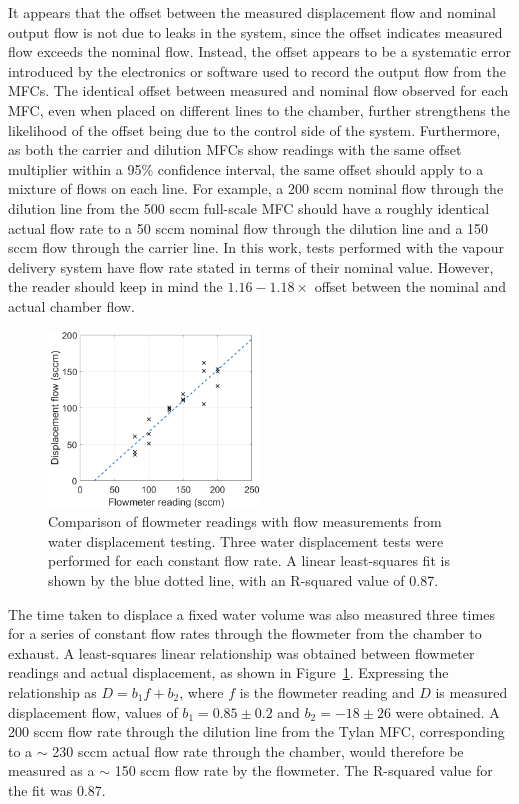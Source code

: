 \documentclass[
  a4paper,
]{scrbook}
\begin{document}
It appears that the offset between the measured displacement flow and
nominal output flow is not due to leaks in the system, since the offset
indicates measured flow exceeds the nominal flow. Instead, the offset
appears to be a systematic error introduced by the electronics or
software used to record the output flow from the MFCs. The identical
offset between measured and nominal flow observed for each MFC, even
when placed on different lines to the chamber, further strengthens the
likelihood of the offset being due to the control side of the system.
Furthermore, as both the carrier and dilution MFCs show readings with
the same offset multiplier within a 95\% confidence interval, the same
offset should apply to a mixture of flows on each line. For example, a
200 sccm nominal flow through the dilution line from the 500 sccm
full-scale MFC should have a roughly identical actual flow rate to a 50
sccm nominal flow through the dilution line and a 150 sccm flow through
the carrier line. In this work, tests performed with the vapour delivery
system have flow rate stated in terms of their nominal value. However,
the reader should keep in mind the \(1.16-1.18 \times\) offset between
the nominal and actual chamber flow.

\begin{figure}

{\centering \includegraphics[width=0.5\textwidth,height=\textheight]{figures/ch5/PID_flowmeter.png}

}

\caption{\label{fig-flowmeter-calibration}Comparison of flowmeter
readings with flow measurements from water displacement testing. Three
water displacement tests were performed for each constant flow rate. A
linear least-squares fit is shown by the blue dotted line, with an
R-squared value of 0.87.}

\end{figure}

The time taken to displace a fixed water volume was also measured three
times for a series of constant flow rates through the flowmeter from the
chamber to exhaust. A least-squares linear relationship was obtained
between flowmeter readings and actual displacement, as shown in
Figure~\ref{fig-flowmeter-calibration}. Expressing the relationship as
\(D = b_1f + b_2\), where \(f\) is the flowmeter reading and \(D\) is
measured displacement flow, values of \(b_1 = 0.85\pm0.2\) and
\(b_2 = -18\pm26\) were obtained. A 200 sccm flow rate through the
dilution line from the Tylan MFC, corresponding to a \(\sim\) 230 sccm
actual flow rate through the chamber, would therefore be measured as a
\(\sim\) 150 sccm flow rate by the flowmeter. The R-squared value for
the fit was 0.87.
\end{document}
